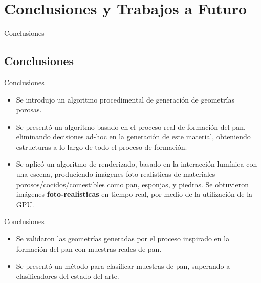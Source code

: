 \documentclass[spanish]{beamer}
\begin{document}
\section[Conclusiones]{Conclusiones y Trabajos a Futuro}


\begin{frame}
\begin{block}{}
\begin{center}
\vspace{1cm}
\huge{Conclusiones}
\vspace{1cm}
\end{center}
\end{block}
\end{frame}

\subsection{Conclusiones}
\begin{frame}{Conclusiones}
\begin{block}{}
\begin{itemize}
\item Se introdujo un algoritmo procedimental de generación de geometrías porosas.
\item Se presentó un algoritmo basado en el proceso real de formación del pan, eliminando decisiones ad-hoc en la generación de este material, obteniendo estructuras a lo largo de todo el proceso de formación.
\item Se aplicó un algoritmo de renderizado, basado en la interacción lumínica con una escena, produciendo imágenes foto-realísticas de materiales porosos/cocidos/comestibles como pan, esponjas, y piedras. Se obtuvieron imágenes \textbf{foto-realísticas} en tiempo real, por medio de la utilización de la GPU.
\end{itemize}
\end{block}
\end{frame}

\begin{frame}{Conclusiones}
\begin{block}{}
\begin{itemize}
\item Se validaron las geometrías generadas por el proceso inspirado en la formación del pan con muestras reales de pan.
\item Se presentó un método para clasificar muestras de pan, superando a clasificadores del estado del arte.
\end{itemize}
\end{block}
\end{frame}
\end{document}
